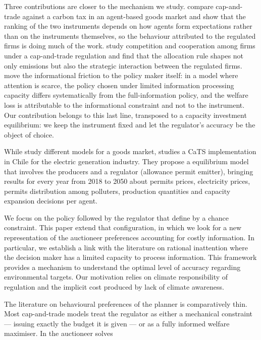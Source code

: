 \documentclass[a4paper,fleqn]{cas-dc}
\begin{document}
Three contributions are closer to the mechanism we study. \citet{foramitti_emission_2021} compare cap-and-trade against a carbon tax in an agent-based goods market and show that the ranking of the two instruments depends on how agents form expectations rather than on the instruments themselves, so the behaviour attributed to the regulated firms is doing much of the work. \citet{chen_competition_2022} study competition and cooperation among firms under a cap-and-trade regulation and find that the allocation rule shapes not only emissions but also the strategic interaction between the regulated firms. \citet{pasten_rational_2016} move the informational friction to the policy maker itself: in a model where attention is scarce, the policy chosen under limited information processing capacity differs systematically from the full-information policy, and the welfare loss is attributable to the informational constraint and not to the instrument. Our contribution belongs to this last line, transposed to a capacity investment equilibrium: we keep the instrument fixed and let the regulator's accuracy be the object of choice.


While \cite{foramitti_emission_2021} study different models for a goods market, \cite{amigo_two_2021} studies a CaTS implementation in Chile for the electric generation industry. They propose a equilibrium model that involves the producers and a regulator (allowance permit emitter), bringing results for every year from 2018 to 2050 about permits prices, electricity prices, permits distribution among polluters, production quantities and capacity expansion decisions per agent. 

We focus on the policy followed by the regulator that \cite{amigo_two_2021} define by a chance constraint. This paper extend that configuration, in which we look for a new representation of the auctioneer preferences accounting for costly information. In particular, we establish a link with the literature on rational inattention where the decision maker has a limited capacity to process information. This framework provides a mechanism to understand the optimal level of accuracy regarding environmental targets. Our motivation relies on climate responsibility of regulation and the implicit cost produced by lack of climate awareness.

The literature on behavioural preferences of the planner is comparatively thin. Most cap-and-trade models treat the regulator as either a mechanical constraint --- issuing exactly the budget it is given --- or as a fully informed welfare maximiser. In \citet{amigo_two_2021} the auctioneer solves
\end{document}
